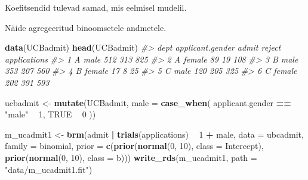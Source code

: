 \documentclass[]{book}
\newenvironment{Shaded}{\begin{snugshade}}{\end{snugshade}}
\newcommand{\KeywordTok}[1]{\textcolor[rgb]{0.13,0.29,0.53}{\textbf{#1}}}
\newcommand{\DataTypeTok}[1]{\textcolor[rgb]{0.13,0.29,0.53}{#1}}
\newcommand{\DecValTok}[1]{\textcolor[rgb]{0.00,0.00,0.81}{#1}}
\newcommand{\StringTok}[1]{\textcolor[rgb]{0.31,0.60,0.02}{#1}}
\newcommand{\CommentTok}[1]{\textcolor[rgb]{0.56,0.35,0.01}{\textit{#1}}}
\newcommand{\OtherTok}[1]{\textcolor[rgb]{0.56,0.35,0.01}{#1}}
\newcommand{\OperatorTok}[1]{\textcolor[rgb]{0.81,0.36,0.00}{\textbf{#1}}}
\newcommand{\NormalTok}[1]{#1}
\begin{document}
Koefitsendid tulevad samad, mis eelmisel mudelil.

Näide agregeeritud binoomsetele andmetele.

\begin{Shaded}
\begin{Highlighting}[]
\KeywordTok{data}\NormalTok{(UCBadmit)}
\KeywordTok{head}\NormalTok{(UCBadmit)}
\CommentTok{#>   dept applicant.gender admit reject applications}
\CommentTok{#> 1    A             male   512    313          825}
\CommentTok{#> 2    A           female    89     19          108}
\CommentTok{#> 3    B             male   353    207          560}
\CommentTok{#> 4    B           female    17      8           25}
\CommentTok{#> 5    C             male   120    205          325}
\CommentTok{#> 6    C           female   202    391          593}
\end{Highlighting}
\end{Shaded}

\begin{Shaded}
\begin{Highlighting}[]
\NormalTok{ucbadmit <-}\StringTok{ }\KeywordTok{mutate}\NormalTok{(UCBadmit, }\DataTypeTok{male =} \KeywordTok{case_when}\NormalTok{(}
\NormalTok{  applicant.gender }\OperatorTok{==}\StringTok{ "male"} \OperatorTok{~}\StringTok{ }\DecValTok{1}\NormalTok{,}
  \OtherTok{TRUE} \OperatorTok{~}\StringTok{ }\DecValTok{0}
\NormalTok{))}
\end{Highlighting}
\end{Shaded}

\begin{Shaded}
\begin{Highlighting}[]
\NormalTok{m_ucadmit1 <-}\StringTok{ }\KeywordTok{brm}\NormalTok{(admit }\OperatorTok{|}\StringTok{ }\KeywordTok{trials}\NormalTok{(applications) }\OperatorTok{~}\StringTok{ }\DecValTok{1} \OperatorTok{+}\StringTok{ }\NormalTok{male,}
                  \DataTypeTok{data =}\NormalTok{ ubcadmit, }
                  \DataTypeTok{family =}\NormalTok{ binomial,}
                  \DataTypeTok{prior =} \KeywordTok{c}\NormalTok{(}\KeywordTok{prior}\NormalTok{(}\KeywordTok{normal}\NormalTok{(}\DecValTok{0}\NormalTok{, }\DecValTok{10}\NormalTok{), }\DataTypeTok{class =}\NormalTok{ Intercept), }
                            \KeywordTok{prior}\NormalTok{(}\KeywordTok{normal}\NormalTok{(}\DecValTok{0}\NormalTok{, }\DecValTok{10}\NormalTok{), }\DataTypeTok{class =}\NormalTok{ b)))}
\KeywordTok{write_rds}\NormalTok{(m_ucadmit1, }\DataTypeTok{path =} \StringTok{"data/m_ucadmit1.fit"}\NormalTok{)}
\end{Highlighting}
\end{Shaded}
\end{document}
